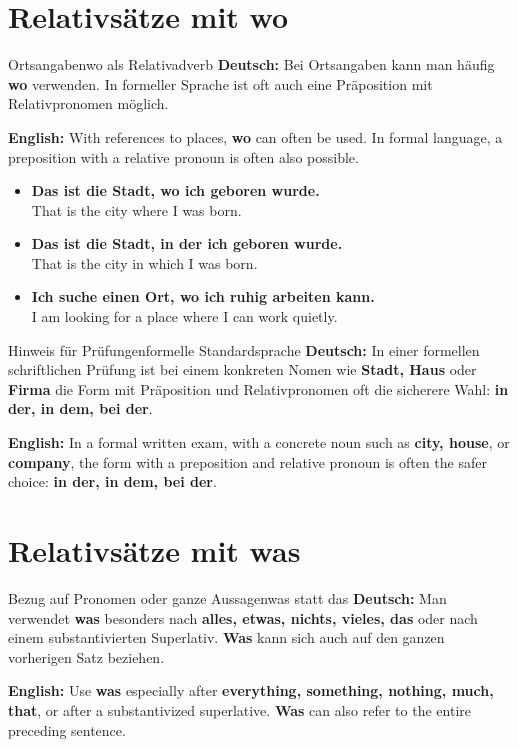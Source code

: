 \documentclass[a4paper,11pt]{article}
\newcommand{\GermanText}[1]{\textbf{Deutsch: }#1\par}
\newcommand{\EnglishText}[1]{{\small\color{SoftGray}\textbf{English: }#1\par}}
\newcommand{\ExampleItem}[2]{\item \textbf{#1}\\{\small\color{SoftGray}#2}}
\begin{document}
    \section{Relativsätze mit \glqq wo\grqq}

        \begin{grammarentry}{Ortsangaben}{wo als Relativadverb}
            \GermanText{Bei Ortsangaben kann man häufig \textbf{wo} verwenden. In formeller Sprache ist oft auch eine Präposition mit Relativpronomen möglich.}
            \EnglishText{With references to places, \textbf{wo} can often be used. In formal language, a preposition with a relative pronoun is often also possible.}
        \end{grammarentry}

        \begin{exbox}
            \begin{itemize}
                \ExampleItem{Das ist die Stadt, wo ich geboren wurde.}{That is the city where I was born.}
                \ExampleItem{Das ist die Stadt, in der ich geboren wurde.}{That is the city in which I was born.}
                \ExampleItem{Ich suche einen Ort, wo ich ruhig arbeiten kann.}{I am looking for a place where I can work quietly.}
            \end{itemize}
        \end{exbox}

        \begin{grammarentry}{Hinweis für Prüfungen}{formelle Standardsprache}
            \GermanText{In einer formellen schriftlichen Prüfung ist bei einem konkreten Nomen wie \textbf{Stadt, Haus} oder \textbf{Firma} die Form mit Präposition und Relativpronomen oft die sicherere Wahl: \textbf{in der, in dem, bei der}.}
            \EnglishText{In a formal written exam, with a concrete noun such as \textbf{city, house}, or \textbf{company}, the form with a preposition and relative pronoun is often the safer choice: \textbf{in der, in dem, bei der}.}
        \end{grammarentry}

    \section{Relativsätze mit \glqq was\grqq}

        \begin{grammarentry}{Bezug auf Pronomen oder ganze Aussagen}{was statt das}
            \GermanText{Man verwendet \textbf{was} besonders nach \textbf{alles, etwas, nichts, vieles, das} oder nach einem substantivierten Superlativ. \textbf{Was} kann sich auch auf den ganzen vorherigen Satz beziehen.}
            \EnglishText{Use \textbf{was} especially after \textbf{everything, something, nothing, much, that}, or after a substantivized superlative. \textbf{Was} can also refer to the entire preceding sentence.}
        \end{grammarentry}
\end{document}
